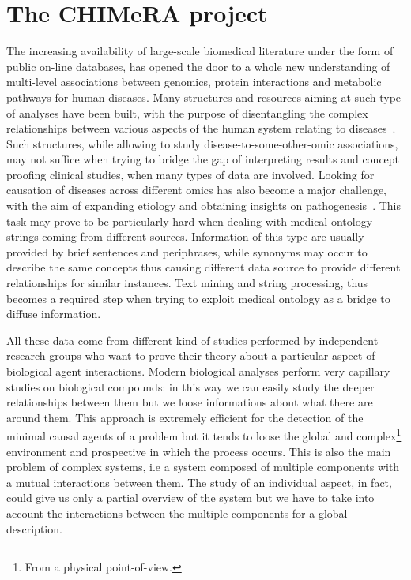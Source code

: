 \documentclass{standalone}
\begin{document}
\section[CHIMeRA]{The CHIMeRA project}\label{chimera:chimera}

The increasing availability of large-scale biomedical literature under the form of public on-line databases, has opened the door to a whole new understanding of multi-level associations between genomics, protein interactions and metabolic pathways for human diseases.
Many structures and resources aiming at such type of analyses have been built, with the purpose of disentangling the complex relationships between various aspects of the human system relating to diseases~\cite{SymtomsNet, HumanPhenotype, chimerDB2017}.
Such structures, while allowing to study disease-to-some-other-omic associations, may not suffice when trying to bridge the gap of interpreting results and concept proofing clinical studies, when many types of data are involved.
Looking for causation of diseases across different omics has also become a major challenge, with the aim of expanding etiology and obtaining insights on pathogenesis~\cite{Barabasi2007}.
This task may prove to be particularly hard when dealing with medical ontology strings coming from different sources.
Information of this type are usually provided by brief sentences and periphrases, while synonyms may occur to describe the same concepts thus causing different data source to provide different relationships for similar instances.
Text mining and string processing, thus becomes a required step when trying to exploit medical ontology as a bridge to diffuse information.

All these data come from different kind of studies performed by independent research groups who want to prove their theory about a particular aspect of biological agent interactions.
Modern biological analyses perform very capillary studies on biological compounds: in this way we can easily study the deeper relationships between them but we loose informations about what there are around them.
This approach is extremely efficient for the detection of the minimal causal agents of a problem but it tends to loose the global and complex\footnote{
  From a physical point-of-view.
} environment and prospective in which the process occurs.
This is also the main problem of complex systems, i.e a system composed of multiple components with a mutual interactions between them.
The study of an individual aspect, in fact, could give us only a partial overview of the system but we have to take into account the interactions between the multiple components for a global description.
\end{document}
